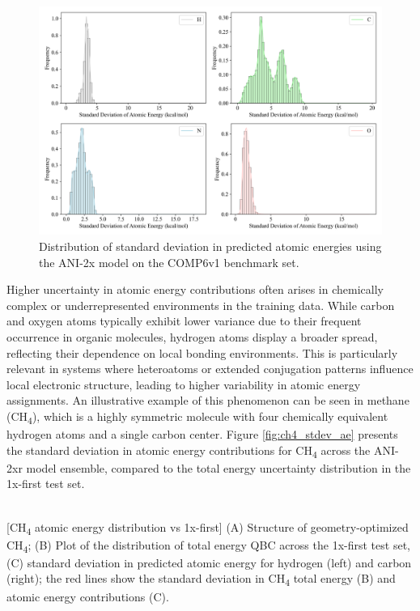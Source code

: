 \begin{figure}[H]
    \centering
    \includegraphics[width=1\linewidth]{Images/2xr_outputs/2xr_comp6v1_stdev-ae-per-atomtype.png}
    \caption[Standard deviation in predicted atomic energy contribution for H, C, N, O atom types]{Distribution of standard deviation in predicted atomic energies using the ANI-2x model on the COMP6v1 benchmark set.}
    \label{fig:2xr_comp6v1_stdev-ae-per-atomtype}
\end{figure}

Higher uncertainty in atomic energy contributions often arises in chemically complex or underrepresented environments in the training data. While carbon and oxygen atoms typically exhibit lower variance due to their frequent occurrence in organic molecules, hydrogen atoms display a broader spread, reflecting their dependence on local bonding environments. This is particularly relevant in systems where heteroatoms or extended conjugation patterns influence local electronic structure, leading to higher variability in atomic energy assignments.
An illustrative example of this phenomenon can be seen in methane (CH\textsubscript{4}), which is a highly symmetric molecule with four chemically equivalent hydrogen atoms and a single carbon center. Figure \ref{fig:ch4_stdev_ae} presents the standard deviation in atomic energy contributions for CH\textsubscript{4} across the ANI-2xr model ensemble, compared to the total energy uncertainty distribution in the 1x-first test set.

\begin{flushleft}
\begin{multiFigure}
     \\
[CH\textsubscript{4} atomic energy distribution vs 1x-first]{
(A) Structure of geometry-optimized CH\textsubscript{4}; 
(B) Plot of the distribution of total energy QBC across the 1x-first test set, 
(C) standard deviation in predicted atomic energy for hydrogen (left) and carbon (right); 
the red lines show the standard deviation in CH\textsubscript{4} total energy (B) and atomic energy contributions (C).
}
\label{fig:ch4_stdev_ae}
\end{multiFigure}
\end{flushleft}

